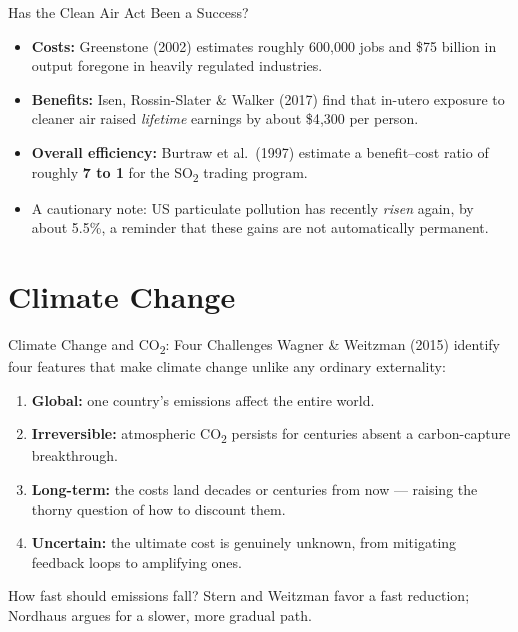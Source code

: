 \documentclass[11pt,aspectratio=169]{beamer}
\begin{document}
\begin{frame}{Has the Clean Air Act Been a Success?}
  \begin{itemize}
    \item \textbf{Costs:} Greenstone (2002) estimates roughly 600{,}000 jobs and \$75 billion in output foregone in heavily regulated industries.
    \item \textbf{Benefits:} Isen, Rossin-Slater \& Walker (2017) find that in-utero exposure to cleaner air raised \emph{lifetime} earnings by about \$4{,}300 per person.
    \item \textbf{Overall efficiency:} Burtraw et al.\ (1997) estimate a benefit--cost ratio of roughly \textbf{7 to 1} for the SO\textsubscript{2} trading program.
    \item A cautionary note: US particulate pollution has recently \emph{risen} again, by about 5.5\%, a reminder that these gains are not automatically permanent.
  \end{itemize}
\end{frame}

\section{Climate Change}

\begin{frame}{Climate Change and CO\textsubscript{2}: Four Challenges}
  Wagner \& Weitzman (2015) identify four features that make climate change unlike any ordinary externality:
  \begin{enumerate}
    \item \textbf{Global:} one country's emissions affect the entire world.
    \item \textbf{Irreversible:} atmospheric CO\textsubscript{2} persists for centuries absent a carbon-capture breakthrough.
    \item \textbf{Long-term:} the costs land decades or centuries from now --- raising the thorny question of how to discount them.
    \item \textbf{Uncertain:} the ultimate cost is genuinely unknown, from mitigating feedback loops to amplifying ones.
  \end{enumerate}
  \vspace{0.3em}
  \small How fast should emissions fall? Stern and Weitzman favor a fast reduction; Nordhaus argues for a slower, more gradual path.
\end{frame}
\end{document}
